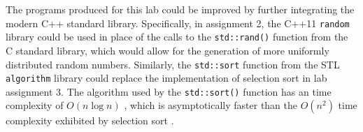 \documentclass[11pt, letterpaper]{article} %
\begin{document}
The programs produced for this lab could be improved by further integrating the modern C++ standard library.  Specifically, in assignment 2, the C++11 \texttt{random} library could be used in place of the calls to the \texttt{std::rand()} function from the C standard library, which would allow for the generation of more uniformly distributed random numbers. Similarly, the \texttt{std::sort} function from the STL \texttt{algorithm} library could replace the implementation of selection sort in lab assignment 3. The algorithm used by the \texttt{std::sort()} function has an time complexity of $O(n\log n)$ \cite{cppreference-algorithm-sort}, which is asymptotically faster than the $O(n^2)$ time complexity exhibited by selection sort \cite{wiki:selection-sort}.


\clearpage



\end{document}
